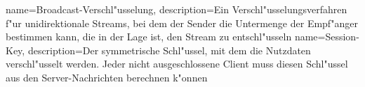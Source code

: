 {
  name=Broadcast-Verschl"usselung,
  description={Ein Verschl"usselungsverfahren f"ur unidirektionale Streams, bei dem der
  Sender die Untermenge der Empf"anger bestimmen kann, die in der Lage ist, den Stream
  zu entschl"usseln}
}
{
  name=Session-Key,
  description={Der symmetrische Schl"ussel, mit dem die Nutzdaten verschl"usselt werden.
  Jeder nicht ausgeschlossene Client muss diesen Schl"ussel aus den Server-Nachrichten
  berechnen k"onnen}
}

\renewcommand*{\glossaryname}{\section{\glossarName}}

\glsaddall
\printglossaries


